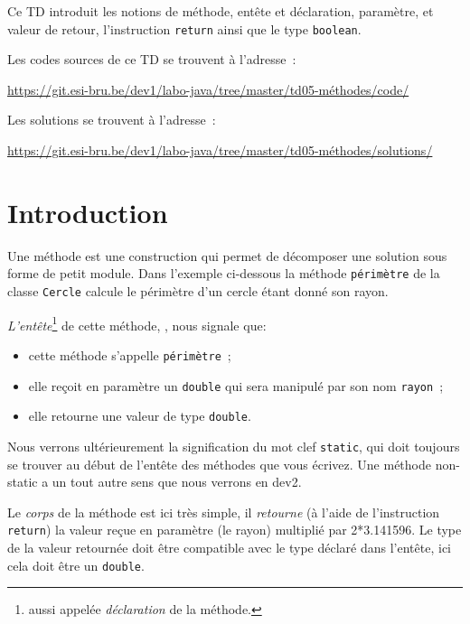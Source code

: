 \documentclass[a4paper,11pt]{article}
\date{2018 -- 2019}
\newcommand{\publicbasepath}{https://git.esi-bru.be/dev1/labo-java/tree/master/td05-méthodes}
\newcommand{\solutionspublicpath}{\publicbasepath/solutions/}
\renewcommand{\listingpublicpath}{\publicbasepath/code/}
\begin{document}
\entete
\titre
{}
\lastedit


	Ce TD introduit les notions de méthode, entête et déclaration, paramètre, et valeur de retour, l'instruction \texttt{return}
	 ainsi que le type \texttt{boolean}.
	 
	 
	Les codes sources de ce TD se trouvent à l'adresse~: 
	
	\url{\listingpublicpath}
	
	Les solutions se trouvent à l'adresse~:
	
	\url{\solutionspublicpath}

	\tableofcontents

	\newpage

\section{Introduction}

	Une méthode est une construction qui permet de décomposer une solution sous forme de petit module.
	Dans l'exemple ci-dessous la méthode \texttt{périmètre} de la classe \texttt{Cercle} calcule le périmètre d'un cercle 
	étant donné son rayon.
	
	

	\emph{L'entête}\footnote{aussi appelée \emph{déclaration} de la méthode. } de cette méthode, ,  nous signale que:
	\begin{itemize}
		\item cette méthode s'appelle \texttt{périmètre}~;
		\item elle reçoit en paramètre un \texttt{double} qui sera manipulé par son nom \texttt{rayon}~;
		\item elle retourne une valeur de type \texttt{double}.
	\end{itemize}
	Nous verrons ultérieurement la signification du mot clef \texttt{static}, qui doit toujours se trouver au début de l'entête des méthodes
	que vous écrivez. Une méthode non-static a un tout autre sens que nous verrons en dev2.

	Le \emph{corps} de la méthode est ici très simple, il \emph{retourne} (à l'aide de l'instruction  \texttt{return})
	 la valeur reçue en paramètre (le rayon) multiplié par 2*3.141596.
	Le type de la valeur retournée doit être compatible avec le type déclaré dans l'entête, 
	ici cela doit être un \texttt{double}.	
	
\end{document}
